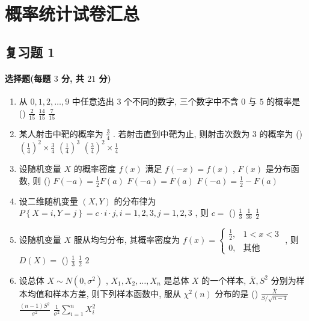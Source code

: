 \chapter{概率统计试卷汇总}

\section{复习题 1}
\subsubsection{选择题(每题 $3$ 分, 共 $21$ 分)}
\begin{enumerate}
	\item 从 $0,1,2,\ldots,9$ 中任意选出 $3$ 个不同的数字, 三个数字中不含 $0$ 与 $5$ 的概率是 (\hspace{1pc})
	{$\frac{2}{15}$}
	{$\frac{14}{15}$}
	{$\frac{7}{15}$}
	
	\item 某人射击中靶的概率为 $\frac{3}{4}$ . 若射击直到中靶为止, 则射击次数为 $3$ 的概率为 (\hspace{1pc})
	{$\left(\frac{1}{4}\right)^2\times\frac{3}{4}$}
	{$\left(\frac{1}{4}\right)^3$}
	{$\left(\frac{3}{4}\right)^2\times\frac{1}{4}$}
	
	\item 设随机变量 $X$ 的概率密度 $f(x)$ 满足 $f(-x)=f(x)$ , $F(x)$ 是分布函数, 则 (\hspace{1pc})
	{$F(-a)=\frac{1}{2}F(a)$}
	{$F(-a)=F(a)$}
	{$F(-a)=\frac{1}{2}-F(a)$}
	
	\item 设二维随机变量 $(X,Y)$ 的分布律为 $P\left\{X=i,Y=j\right\}=c\cdot i\cdot j,i=1,2,3,j=1,2,3$ , 则 $c=$ (\hspace{1pc})
	{$\frac{1}{3}$}
	{$\frac{1}{36}$}
	{$\frac{1}{2}$}
	
	\item 设随机变量 $X$ 服从均匀分布, 其概率密度为 $f(x)=
	\begin{cases}
	\frac{1}{2}, & 1<x<3\\
	0, & \text{其他}
	\end{cases}
	$ , 则 $D(X)=$ (\hspace{1pc})
	{$\frac{1}{3}$}
	{$\frac{1}{2}$}
	{$2$}
	
	\item 设总体 $X\sim N\left(0,\sigma^2\right)$ , $X_1,X_2,\ldots,X_n$ 是总体 $X$ 的一个样本, $\overline{X},S^2$ 分别为样本均值和样本方差, 则下列样本函数中, 服从 $\chi^2(n)$ 分布的是 (\hspace{1pc})
	{$\frac{\overline{X}}{S/\sqrt{n-1}}$}
	{$\frac{(n-1)S^2}{\sigma^2}$}
	{$\frac{1}{\sigma^2}\sum_{i=1}^{n}X_i^2$}
	

\end{enumerate}
